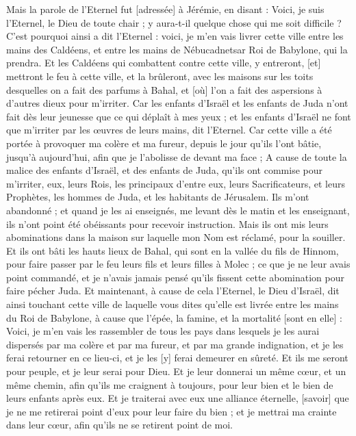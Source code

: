 \begin{multicols}{2}
Mais la parole de l'Eternel fut [adressée] à Jérémie, en disant :
Voici, je suis l'Eternel, le Dieu de toute chair ; y aura-t-il quelque chose qui me soit difficile ?
C'est pourquoi ainsi a dit l'Eternel : voici, je m'en vais livrer cette ville entre les mains des Caldéens, et entre les mains de Nébucadnetsar Roi de Babylone, qui la prendra.
Et les Caldéens qui combattent contre cette ville, y entreront, [et] mettront le feu à cette ville, et la brûleront, avec les maisons sur les toits desquelles on a fait des parfums à Bahal, et [où] l'on a fait des aspersions à d'autres dieux pour m'irriter.
Car les enfants d'Israël et les enfants de Juda n'ont fait dès leur jeunesse que ce qui déplaît à mes yeux ; et les enfants d'Israël ne font que m'irriter par les œuvres de leurs mains, dit l'Eternel.
Car cette ville a été portée à provoquer ma colère et ma fureur, depuis le jour qu'ils l'ont bâtie, jusqu’à aujourd'hui, afin que je l'abolisse de devant ma face ;
A cause de toute la malice des enfants d'Israël, et des enfants de Juda, qu'ils ont commise pour m'irriter, eux, leurs Rois, les principaux d'entre eux, leurs Sacrificateurs, et leurs Prophètes, les hommes de Juda, et les habitants de Jérusalem.
Ils m'ont abandonné ; et quand je les ai enseignés, me levant dès le matin et les enseignant, ils n'ont point été obéissants pour recevoir instruction.
Mais ils ont mis leurs abominations dans la maison sur laquelle mon Nom est réclamé, pour la souiller.
Et ils ont bâti les hauts lieux de Bahal, qui sont en la vallée du fils de Hinnom, pour faire passer par le feu leurs fils et leurs filles à Molec ; ce que je ne leur avais point commandé, et je n'avais jamais pensé qu'ils fissent cette abomination pour faire pécher Juda.
Et maintenant, à cause de cela l'Eternel, le Dieu d'Israël, dit ainsi touchant cette ville de laquelle vous dites qu'elle est livrée entre les mains du Roi de Babylone, à cause que l'épée, la famine, et la mortalité [sont en elle] :
Voici, je m'en vais les rassembler de tous les pays dans lesquels je les aurai dispersés par ma colère et par ma fureur, et par ma grande indignation, et je les ferai retourner en ce lieu-ci, et je les [y] ferai demeurer en sûreté.
Et ils me seront pour peuple, et je leur serai pour Dieu.
Et je leur donnerai un même cœur, et un même chemin, afin qu'ils me craignent à toujours, pour leur bien et le bien de leurs enfants après eux.
Et je traiterai avec eux une alliance éternelle, [savoir] que je ne me retirerai point d'eux pour leur faire du bien ; et je mettrai ma crainte dans leur cœur, afin qu'ils ne se retirent point de moi.

\end{multicols}
